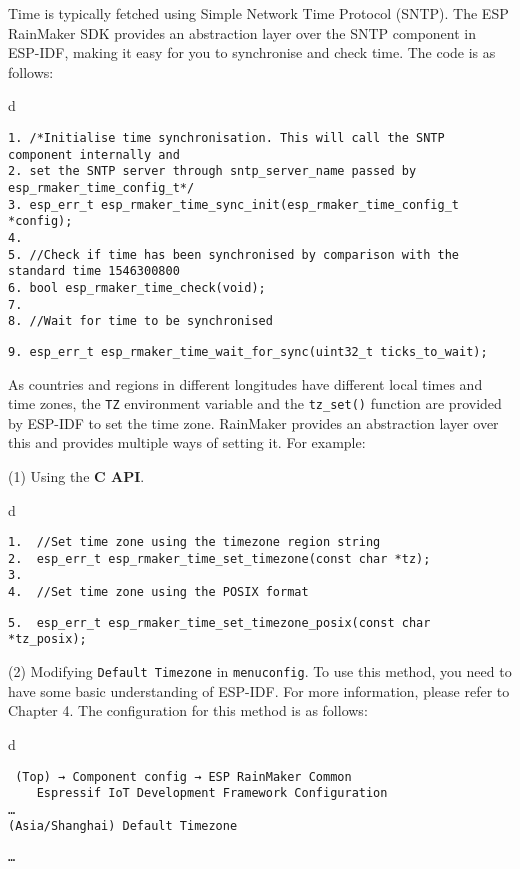 \documentclass[a4paper,12pt]{book}
\begin{document}
Time is typically fetched using Simple Network Time Protocol (SNTP). The ESP RainMaker SDK provides an abstraction layer over the SNTP component in ESP-IDF, making it easy for you to synchronise and check time. The code is as follows:

\begin{codebloc}
\begin{tabular}{d}
\vspace{2pt}
\fontsize{9pt}{10pt}\selectfont
\begin{verbatim}
1. /*Initialise time synchronisation. This will call the SNTP component internally and 
2. set the SNTP server through sntp_server_name passed by esp_rmaker_time_config_t*/
3. esp_err_t esp_rmaker_time_sync_init(esp_rmaker_time_config_t *config);
4.
5. //Check if time has been synchronised by comparison with the standard time 1546300800
6. bool esp_rmaker_time_check(void);
7.
8. //Wait for time to be synchronised
\end{verbatim}
\verb|9. esp_err_t esp_rmaker_time_wait_for_sync(uint32_t ticks_to_wait);|
\end{tabular}
\end{codebloc}

As countries and regions in different longitudes have different local times and time zones, the \verb|TZ| environment variable and the \verb|tz_set()| function are provided by ESP-IDF to set the time zone. RainMaker provides an abstraction layer over this and provides multiple ways of setting it. For example:

(1) Using the \textbf{C API}.

\begin{codebloc}
\begin{tabular}{d}
\vspace{2pt}
\begin{verbatim}
1.  //Set time zone using the timezone region string
2.  esp_err_t esp_rmaker_time_set_timezone(const char *tz);
3.
4.  //Set time zone using the POSIX format
\end{verbatim}
\verb|5.  esp_err_t esp_rmaker_time_set_timezone_posix(const char *tz_posix);|
\end{tabular}
\end{codebloc}

(2) Modifying \verb|Default Timezone| in \verb|menuconfig|. To use this method, you need to have some basic understanding of ESP-IDF. For more information, please refer to Chapter 4. The configuration for this method is as follows:

\begin{codebloc}
\begin{tabular}{d}
\vspace{2pt}
\begin{verbatim}
 (Top) → Component config → ESP RainMaker Common
    Espressif IoT Development Framework Configuration
…
(Asia/Shanghai) Default Timezone
\end{verbatim}
\verb|…|
\end{tabular}
\end{codebloc}
\end{document}

